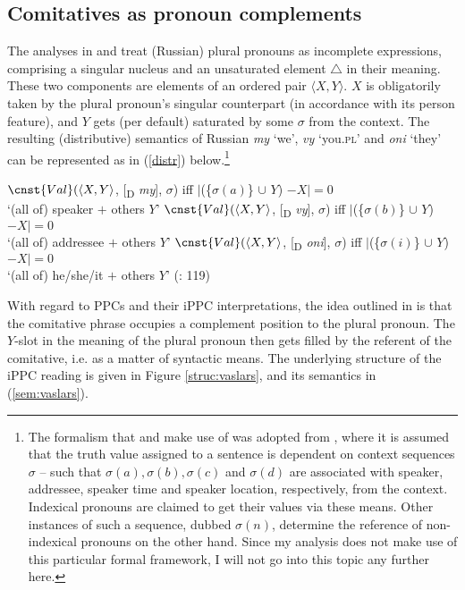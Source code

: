 \documentclass[output=paper,colorlinks,citecolor=brown]{langscibook}
\begin{document}
\subsection{Comitatives as pronoun complements}\label{sec:proncomp}
The analyses in \citet{VassilievaLarson2001} and \citet{VassilievaLarson2005} treat (Russian) plural pronouns as incomplete expressions, comprising a singular nucleus and an unsaturated element $\triangle$ in their meaning. These two components are elements of an ordered pair $\langle X, Y\rangle$. $X$ is obligatorily taken by the plural pronoun's singular counterpart (in accordance with its person feature), and $Y$ gets (per default) saturated by some $\sigma$ from the context. The resulting (distributive) semantics of Russian \textit{my} `we', \textit{vy} `you.\textsc{pl}' and \textit{oni} `they' can be represented as in (\ref{distr}) below.\footnote{The formalism that \citet{VassilievaLarson2001} and \citet{VassilievaLarson2005} make use of was adopted from \citet{LarsonSegal1995}, where it is assumed that the truth value assigned to a sentence is dependent on context sequences $\sigma$ -- such that $\sigma(a), \sigma(b), \sigma(c)$ and $\sigma(d)$ are associated with speaker, addressee, speaker time and speaker location, respectively, from the context. Indexical pronouns are claimed to get their values via these means. Other instances of such a sequence, dubbed $\sigma(n)$, determine the reference of non-indexical pronouns on the other hand. Since my analysis does not make use of this particular formal framework, I will not go into this topic any further here.}

\ea \label{distr} \ea $\cnst{Val}(\langle X, Y\rangle$, [\textsubscript{D} \textit{my}], $\sigma$) iff $\mid$(\{$\sigma(a)$\} $\cup$ $Y$) $- X\mid = 0$ \\
 `(all of) speaker $+$ others $Y$'
\ex $\cnst{Val}(\langle X, Y\rangle$, [\textsubscript{D} \textit{vy}], $\sigma$) iff $\mid$(\{$\sigma(b)$\} $\cup$ $Y$) $- X\mid = 0$ \\
 `(all of) addressee $+$ others $Y$'
\ex $\cnst{Val}(\langle X, Y\rangle$, [\textsubscript{D} \textit{oni}], $\sigma$) iff $\mid$(\{$\sigma(i)$\} $\cup$ $Y$) $- X\mid = 0$ \\
 `(all of) he/she/it $+$ others $Y$'
\z
\hfill (\cite{VassilievaLarson2005}: 119)
\z

\noindent With regard to PPCs and their iPPC interpretations, the idea outlined in \citet{VassilievaLarson2005} is that the comitative phrase occupies a complement position to the plural pronoun. The $Y$-slot in the meaning of the plural pronoun then gets filled by the referent of the comitative, i.e. as a matter of syntactic means. The underlying structure of the iPPC reading is given in Figure \ref{struc:vaslars}, and its semantics in (\ref{sem:vaslars}). 
\end{document}
